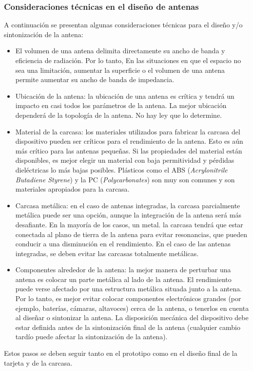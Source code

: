 \subsubsection{Consideraciones técnicas en el diseño de antenas}
A continuación se presentan algunas consideraciones técnicas para el diseño y/o sintonización de la antena:
\begin{itemize}
    \item El volumen de una antena delimita directamente su ancho de banda y eficiencia de radiación\citep{Gustafsson2007}. Por lo tanto, En las situaciones en que el espacio no sea una limitación, aumentar la superficie o el volumen de una antena permite aumentar su ancho de banda de impedancia\citep{TAntena2008}.
    \item Ubicación de la antena: la ubicación de una antena es crítica y tendrá un impacto en casi
    todos los parámetros de la antena. La mejor ubicación dependerá de la topología de la antena. No hay ley que lo determine\citep{CertificationSigfox}.
    \item Material de la carcasa: los materiales utilizados para fabricar la carcasa del dispositivo pueden ser críticos para el rendimiento de la antena. Esto es aún más crítico para las antenas pequeñas. Si las propiedades del material están disponibles, es mejor elegir un material con baja permitividad y pérdidas dieléctricas lo más bajas posibles. Plásticos como el ABS (\textit{Acrylonitrile Butadiene Styrene}) y la PC (\textit{Polycarbonates}) son muy son comunes y son materiales apropiados para la carcasa\citep{CertificationSigfox}.
    
    \item Carcasa metálica: en el caso de antenas integradas, la carcasa parcialmente metálica puede ser una opción, aunque la integración de la antena será más desafiante. En la mayoría de los casos, un metal. la carcasa tendrá que estar conectada al plano de tierra de la antena para evitar resonancias, que pueden conducir a una disminución en el rendimiento.  En el caso de las antenas integradas, se deben evitar las carcasas totalmente metálicas\citep{CertificationSigfox}.
    \item Componentes alrededor de la antena: la mejor manera de perturbar una antena es colocar un parte metálica al lado de la antena. El rendimiento puede verse afectado por una estructura metálica situada junto a la antena. Por lo tanto, es mejor evitar colocar componentes electrónicos grandes (por ejemplo, baterías, cámaras, altavoces) cerca de la antena, o tenerlos en cuenta al diseñar o sintonizar la antena. La disposición mecánica del dispositivo debe estar definida antes de la sintonización final de la antena (cualquier cambio tardío puede afectar la sintonización de la antena)\citep{CertificationSigfox}.
\end{itemize}
Estos pasos se deben seguir tanto en el prototipo como en el diseño final de la tarjeta y de la carcasa.

